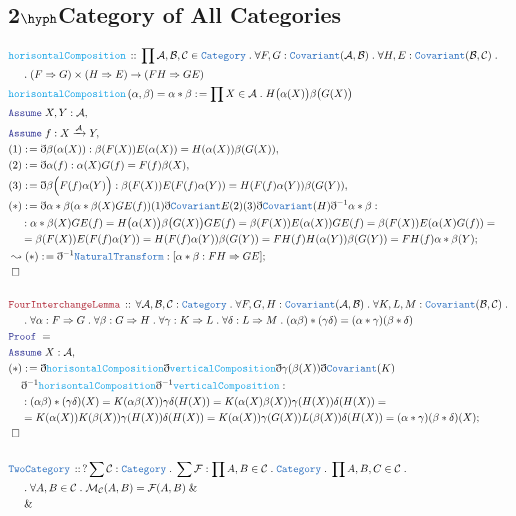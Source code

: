 \documentclass[12pt]{scrartcl}
\newcommand{\TYPE}[1]{\textcolor{NavyBlue}{\mathtt{#1}}}
\newcommand{\FUNC}[1]{\textcolor{Cerulean}{\mathtt{#1}}}
\newcommand{\LOGIC}[1]{\textcolor{Blue}{\mathtt{#1}}}
\newcommand{\THM}[1]{\textcolor{Maroon}{\mathtt{#1}}}
\renewcommand{\.}{\; . \;}
\newcommand{\de}{: \kern 0.1pc =}
\newcommand{\Act}[1]{\left( #1 \right)}
\newcommand{\Theorem}[2]{& \THM{#1} \, :: \, #2 \\ & \Proof = \\ }
\newcommand{\DeclareType}[2]{& \TYPE{#1} \, :: \, #2 \\}
\newcommand{\DeclareFunc}[2]{& \FUNC{#1} \, :: \, #2 \\}
\newcommand{\DefineNamedFunc}[4]{&  \FUNC{#1}\Act{#2} = #3 \de #4 \\}
\newcommand{\NewLine}{\\ & \kern 1pc}
\newcommand{\Page}[1]{ \begin{align*} #1 \end{align*}   }
\newcommand{ \bd }{ \ByDef }
\renewcommand{\And}{\; \& \;}
\newcommand{\Cat}{\TYPE{Category}}
\newcommand{\Mor}{\mathcal{M}}
\newcommand{\Arrow}{\xrightarrow}
\newcommand{\Say}[3]{& #1 \de #2 : #3, \\}
\newcommand{\Conclude}[3]{& #1 \de #2 : #3; \\}
\newcommand{\DeriveConclude}[3]{& \leadsto #1 \de #2 : #3 ; \\}
\newcommand{\Assume}[2]{& \LOGIC{Assume} \; #1 : #2, \\}
\newcommand{\QED}{\; \square}
\newcommand{\EndProof}{& \QED \\}
\newcommand{\ByDef}{\eth}
\newcommand{\Proof}{\LOGIC{Proof} \; }
\newcommand{\Cov}{\TYPE{Covariant}}
\newcommand{\NT}{\TYPE{NaturalTransform}}
\newcommand{\C}{\mathcal{C}}
\newcommand{\A}{\mathcal{A}}
\newcommand{\B}{\mathcal{B}}
\begin{document}
\subsection{2$\hyph$Category of All Categories}
\Page{
	\DeclareFunc{horisontalComposition}{\prod \A, \B, \C \in \Cat \. 
		\forall F,G : \Cov(\A,\B) \. \forall H,E : \Cov(\B,\C) \. \NewLine 
		\. (F \Rightarrow G) \times (H \Rightarrow E) \to (FH \Rightarrow GE)
	}
	\DefineNamedFunc{horisontalComposition}{\alpha,\beta}{\alpha * \beta }{ \prod X \in \A \. 
		H\big(\alpha(X)\big)\beta\big(G(X)\big)  }
	\Assume{X,Y}{\A}
	\Assume{f}{X \Arrow{\A} Y}
	\Say{(1)}{\bd \beta (\alpha(X))}{ \beta(F(X))E(\alpha(X)) = H(\alpha(X))\beta(G(X))  }
	\Say{(2)}{\bd \alpha( f )}{ \alpha(X)G(f) = F(f) \beta(X)   }
	\Say{(3)}{\bd \beta \Big( F(f) \alpha(Y)   \Big)}{ \beta(F(X)) E( F(f) \alpha(Y) ) =  H( F(f) \alpha(Y) ) \beta( G(Y) ) }
	\Conclude{(*)}{\bd \alpha * \beta (\alpha * \beta(X)GE(f))(1)\bd\Cov E (2)(3) \bd \Cov (H) \bd^{-1} \alpha * \beta}
	{ \NewLine : 
		\alpha * \beta(X) GE(f) = H\big(\alpha(X)\big)\beta\big(G(X)\big) GE(f) =  
		 \beta(F(X)) E(\alpha(X)) GE(f) = \beta(F(X)) E(\alpha(X) G(f)) = \NewLine 
		 = \beta(F(X)) E( F(f) \alpha(Y) ) =  H( F(f) \alpha(Y) ) \beta( G(Y) ) 
		 = FH(f) H( \alpha(Y) ) \beta(G(Y)) = FH(f) \alpha * \beta(Y)
	}
	\DeriveConclude{(*)}{\bd^{-1} \NT}{[\alpha * \beta : FH \Rightarrow GE]}
	\EndProof
	\\
	\Theorem{FourInterchangeLemma}{\forall \A,\B,\C : \Cat \. \forall F,G,H : \Cov(\A,\B) \. \forall K,L,M : \Cov(\B,\C) \. 
	        \NewLine \. \forall \alpha : F \Rightarrow G \. \forall \beta : G \Rightarrow H \. 
		\forall \gamma : K \Rightarrow L \. \forall \delta : L \Rightarrow M \. 
		 (\alpha\beta) * (\gamma \delta) = (\alpha * \gamma)(\beta * \delta)
	}
	\Assume{X}{\A}
	\Conclude{(*)}{ 
		\bd \FUNC{horisontalComposition} \bd \FUNC{verticalComposition} \bd \gamma (\beta(X))
		\bd \Cov(K)\NewLine 	
		\bd^{-1} \FUNC{horisontalComposition} \bd^{-1} \FUNC{verticalComposition}
	}
	{ \NewLine : 
		(\alpha \beta) * (\gamma \delta)(X) = K( \alpha \beta(X)  ) \gamma \delta (H(X)) = 
		K( \alpha(X) \beta(X) ) \gamma(H(X)) \delta(H(X)) = \NewLine = 
		K( \alpha(X)) K(\beta(X)) \gamma(H(X)) \delta(H(X)) =
		K( \alpha(X)) \gamma( G(X)) L(\beta(X)) \delta( H(X)) = (\alpha * \gamma)(\beta * \delta)(X)
	}
	\EndProof
	\\
	\DeclareType{TwoCategory}{ ?\sum \C : \Cat \. \sum \mathcal{F} : \prod A,B \in \C \. \Cat \.  
		\prod A,B,C \in \C \.  \NewLine \.  \forall A,B \in \C \. \Mor_{\C}(A,B) = \mathcal{F}(A,B) \And \NewLine \And
}}
\end{document}
